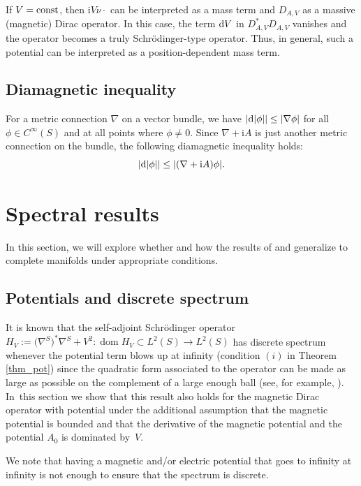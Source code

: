 \documentclass[pdftex]{sigma}
\numberwithin{equation}{section}
\begin{document}
\begin{Remark} If $V={\rm const}$, then ${\mathrm{i}}V\nu \cdot$ can be interpreted as a mass term and $D_{A,V}$ as a massive (magnetic) Dirac operator. In this case, the term ${\rm d}V$ in $D^*_{A,V}D_{A,V}$ vanishes and the operator becomes a truly Schr\"odinger-type operator. Thus, in general, such a potential can be interpreted as a position-dependent mass term.\end{Remark}

\subsection{Diamagnetic inequality}
For a metric connection $\nabla$ on a vector bundle, we have $|{\rm d}|\phi||\leq |\nabla \phi|$ for all $\phi\in C^\infty(S)$ and at all points where $\phi\neq 0$.
Since $\nabla +{\mathrm{i}}A$ is just another metric connection on the bundle, the following diamagnetic inequality holds:
\[ |{\rm d}|\phi||\leq |(\nabla + {\mathrm{i}}A )\phi|.\]


\section{Spectral results}
In this section, we will explore whether and how the results of \cite[Section~6]{CFKS} and \cite{Yamada} generalize to complete manifolds under appropriate conditions.

\subsection{Potentials and discrete spectrum}
It is known that the self-adjoint Schr\"odinger operator ${H}_V:= \bigl(\nabla^S\bigr)^*\nabla^S + V^2\colon \operatorname{dom}  H_V\subset L^2(S)\to L^2(S)$ has discrete spectrum whenever the potential term blows up at infinity (condition $(i)$ in Theorem \ref{thm_pot}) since the quadratic form associated to the operator can be made as large as possible on the complement of a large enough ball (see, for example, \cite[Theorem~XIII.16]{RS4}). In~this section we show that this result also holds for the magnetic Dirac operator with potential under the additional assumption that the magnetic potential is bounded and that the derivative of the magnetic potential and the potential $A_0$ is dominated by~$V$.

We note that having a magnetic and/or electric potential that goes to infinity at infinity is not enough to ensure that the spectrum is discrete.
\end{document}
